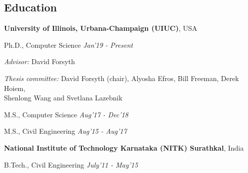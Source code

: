 \documentclass[margin,line]{res}
\newenvironment{list1}{
  \begin{list}{\ding{113}}{%
      \setlength{\itemsep}{0in}
      \setlength{\parsep}{0in} \setlength{\parskip}{0in}
      \setlength{\topsep}{0in} \setlength{\partopsep}{0in} 
      \setlength{\leftmargin}{0.17in}}}{\end{list}}
\begin{document}
\begin{resume}
\section{\sc \large Education}
{\bf University of Illinois, Urbana-Champaign (UIUC)}, USA 
\\ \vspace*{-.12in}
\begin{list1}
\item[] Ph.D., Computer Science \hfill{\em Jan'19 - Present}
\item[] {\em Advisor:} David Forsyth \hfill {}
\item[] {\em Thesis committee:} David Forsyth (chair), Alyosha Efros, Bill Freeman,
 Derek Hoiem, \\ Shenlong Wang and  Svetlana Lazebnik  \hfill {}\\\vspace*{-.1in}
\item[] M.S., Computer Science \hfill{\em Aug'17 - Dec'18}
\item[] M.S., Civil Engineering \hfill{\em Aug'15 - Aug'17}
\end{list1}
{\bf National Institute of Technology Karnataka (NITK) Surathkal}, India
\\\vspace*{-.12in}
\begin{list1}
\item[] B.Tech., Civil Engineering \hfill{\em July'11 - May'15}
\end{list1}


\end{resume}
\end{document}
